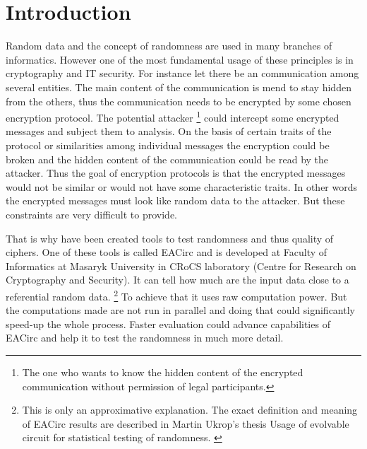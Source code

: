 \documentclass[12pt,oneside]{fithesis2}
\begin{document}
\FrontMatter
	\ThesisTitlePage
	\tableofcontents

\MainMatter
\chapter{Introduction}
Random data and the concept of randomness are used in many branches of informatics. However one of the most fundamental usage of these principles is in cryptography and IT security. For instance let there be an communication among several entities. The main content of the communication is mend to stay hidden from the others, thus the communication needs to be encrypted by some chosen encryption protocol. The potential attacker \footnote{The one who wants to know the hidden content of the encrypted communication without permission of legal participants.} could intercept some encrypted messages and subject them to analysis. On the basis of certain traits of the protocol or similarities among individual messages the encryption could be broken and the hidden content of the communication could be read by the attacker. Thus the goal of encryption protocols is that the encrypted messages would not be similar or would not have some characteristic traits. In other words the encrypted messages must look like random data to the attacker. But these constraints are very difficult to provide.

That is why have been created tools to test randomness and thus quality of ciphers. One of these tools is called EACirc and is developed at Faculty of Informatics at Masaryk University in CRoCS laboratory (Centre for Research on Cryptography and Security). It can tell how much are the input data close to a referential random data. \footnote{This is only an approximative explanation. The exact definition and meaning of EACirc results are described in Martin Ukrop's thesis Usage of evolvable circuit for statistical testing of randomness. \cite{ukrop_thesis}} To achieve that it uses raw computation power. But the computations made are not run in parallel and doing that could significantly speed-up the whole process. Faster evaluation could advance capabilities of EACirc and help it to test the randomness in much more detail.
\end{document}
